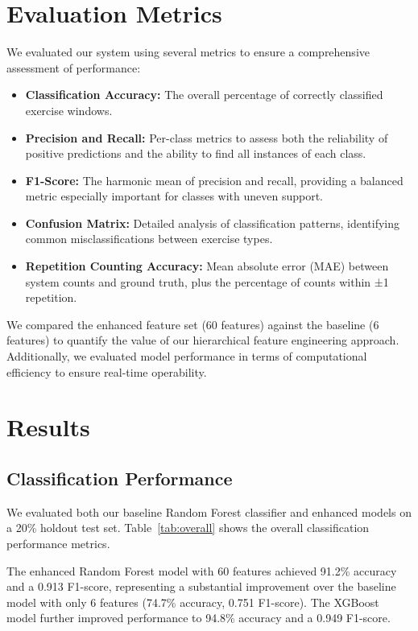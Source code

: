 \documentclass[conference]{IEEEtran}
\begin{document}
\section{Evaluation Metrics}
We evaluated our system using several metrics to ensure a comprehensive assessment of performance:

\begin{itemize}
    \item \textbf{Classification Accuracy:} The overall percentage of correctly classified exercise windows.
    \item \textbf{Precision and Recall:} Per-class metrics to assess both the reliability of positive predictions and the ability to find all instances of each class.
    \item \textbf{F1-Score:} The harmonic mean of precision and recall, providing a balanced metric especially important for classes with uneven support.
    \item \textbf{Confusion Matrix:} Detailed analysis of classification patterns, identifying common misclassifications between exercise types.
    \item \textbf{Repetition Counting Accuracy:} Mean absolute error (MAE) between system counts and ground truth, plus the percentage of counts within ±1 repetition.
\end{itemize}

We compared the enhanced feature set (60 features) against the baseline (6 features) to quantify the value of our hierarchical feature engineering approach. Additionally, we evaluated model performance in terms of computational efficiency to ensure real-time operability.

\section{Results}
\subsection{Classification Performance}
We evaluated both our baseline Random Forest classifier and enhanced models on a 20\% holdout test set. Table~\ref{tab:overall} shows the overall classification performance metrics.

The enhanced Random Forest model with 60 features achieved 91.2\% accuracy and a 0.913 F1-score, representing a substantial improvement over the baseline model with only 6 features (74.7\% accuracy, 0.751 F1-score). The XGBoost model further improved performance to 94.8\% accuracy and a 0.949 F1-score.
\end{document}
